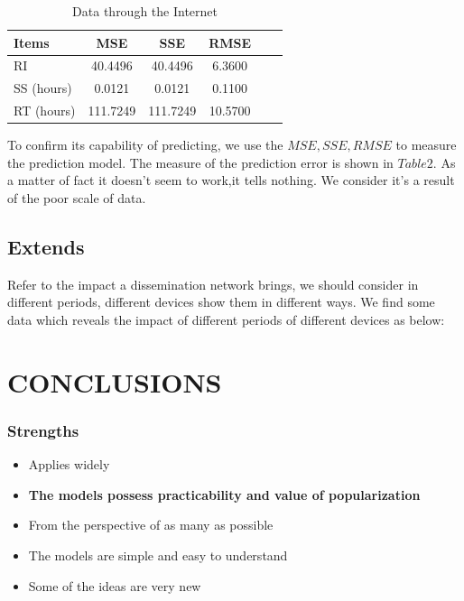 \begin{table}
	\centering%
	\begin{tabular}{lccccc}  %
		\hline
		Items & MSE & SSE   & RMSE\\ \hline  %
		RI   & 40.4496  & 40.4496  & 6.3600 \\         %
		SS (hours)& 0.0121  & 0.0121 & 0.1100 \\        %
		RT (hours) & 111.7249 & 111.7249 & 10.5700   \\
		\hline
	\end{tabular}
	\caption{Data through the Internet}\label{tab:1}
\end{table} 
\par To confirm its capability of predicting, we use the $MSE,SSE,RMSE$ to measure the prediction model. The measure of the prediction error is shown in $Table 2$. As a matter of fact it doesn't seem to work,it tells nothing. We consider it's a result of the poor scale of data.
\subsection*{Extends}
\par Refer to the impact a dissemination network brings, we should consider in different periods, different devices show them in different ways. We find some data which reveals the impact of different periods of different devices as below:




\section{CONCLUSIONS}
\subsubsection*{Strengths}
\begin{itemize}
	\item {Applies widely}
	\item \textbf{The models possess practicability and value of popularization}
	\item {From the perspective of as many as possible }
	\item {The models are simple and easy to understand}
	\item {Some of the ideas are very new}
\end{itemize}

